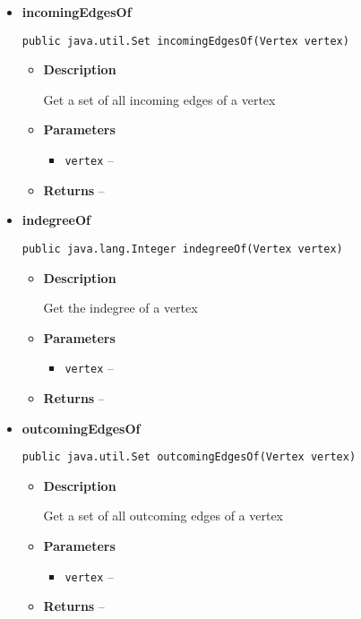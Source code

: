 {{{{{{{{{{{{{{\begin{itemize}
{\begin{itemize}
{}%
\end{itemize}
}%
\item{ 
{\bf  incomingEdgesOf}\\
\begin{lstlisting}[frame=none]
public java.util.Set incomingEdgesOf(Vertex vertex)\end{lstlisting} %
\begin{itemize}
\item{
{\bf  Description}

Get a set of all incoming edges of a vertex
}
\item{
{\bf  Parameters}
  \begin{itemize}
   \item{
\texttt{vertex} -- }
  \end{itemize}
}%
\item{{\bf  Returns} -- 
 
}%
\end{itemize}
}%
\item{ 
{\bf  indegreeOf}\\
\begin{lstlisting}[frame=none]
public java.lang.Integer indegreeOf(Vertex vertex)\end{lstlisting} %
\begin{itemize}
\item{
{\bf  Description}

Get the indegree of a vertex
}
\item{
{\bf  Parameters}
  \begin{itemize}
   \item{
\texttt{vertex} -- }
  \end{itemize}
}%
\item{{\bf  Returns} -- 
 
}%
\end{itemize}
}%
\item{ 
{\bf  outcomingEdgesOf}\\
\begin{lstlisting}[frame=none]
public java.util.Set outcomingEdgesOf(Vertex vertex)\end{lstlisting} %
\begin{itemize}
\item{
{\bf  Description}

Get a set of all outcoming edges of a vertex
}
\item{
{\bf  Parameters}
  \begin{itemize}
   \item{
\texttt{vertex} -- }
  \end{itemize}
}%
\item{{\bf  Returns} -- 
 
}
\end{itemize}}
\end{itemize}}}}}}}}}}}}}}}
